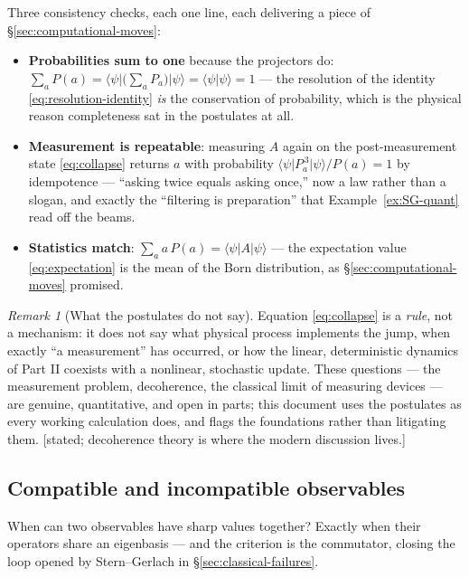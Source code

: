 \documentclass[11pt]{article}
\theoremstyle{plain}
\theoremstyle{definition}
\theoremstyle{remark}
\newtheorem{remark}[theorem]{Remark}
\newcommand{\ket}[1]{\lvert #1 \rangle}
\newcommand{\bra}[1]{\langle #1 \rvert}
\newcommand{\braket}[2]{\langle #1 | #2 \rangle}
\begin{document}
\noindent
Three consistency checks, each one line, each delivering a piece of
\S\ref{sec:computational-moves}:
\begin{itemize}
  \item \textbf{Probabilities sum to one} because the projectors do:
  $\sum_a P(a) = \bra\psi\bigl(\sum_a P_a\bigr)\ket\psi
  = \braket\psi\psi = 1$ --- the resolution of the identity
  \eqref{eq:resolution-identity} \emph{is} the conservation of
  probability, which is the physical reason completeness sat in the
  postulates at all.
  \item \textbf{Measurement is repeatable}: measuring $A$ again on
  the post-measurement state \eqref{eq:collapse} returns $a$ with
  probability $\bra\psi P_a^{\,3}\ket\psi/P(a) = 1$ by idempotence
  --- ``asking twice equals asking once,'' now a law rather than a
  slogan, and exactly the ``filtering is preparation'' that
  Example~\ref{ex:SG-quant} read off the beams.
  \item \textbf{Statistics match}: $\sum_a a\,P(a) =
  \bra\psi A\ket\psi$ --- the expectation value
  \eqref{eq:expectation} is the mean of the Born distribution, as
  \S\ref{sec:computational-moves} promised.
\end{itemize}

\begin{remark}[What the postulates do not say]
\label{rem:measurement-problem}
Equation \eqref{eq:collapse} is a \emph{rule}, not a mechanism: it
does not say what physical process implements the jump, when exactly
``a measurement'' has occurred, or how the linear, deterministic
dynamics of Part II coexists with a nonlinear, stochastic update.
These questions --- the measurement problem, decoherence, the
classical limit of measuring devices --- are genuine, quantitative,
and open in parts; this document uses the postulates as every
working calculation does, and flags the foundations rather
than litigating them. [stated; decoherence theory is where the
modern discussion lives.]
\end{remark}

\subsection{Compatible and incompatible observables}
\label{sec:compatibility}

When can two observables have sharp values together? Exactly when
their operators share an eigenbasis --- and the criterion is the
commutator, closing the loop opened by Stern--Gerlach in
\S\ref{sec:classical-failures}.
\end{document}
